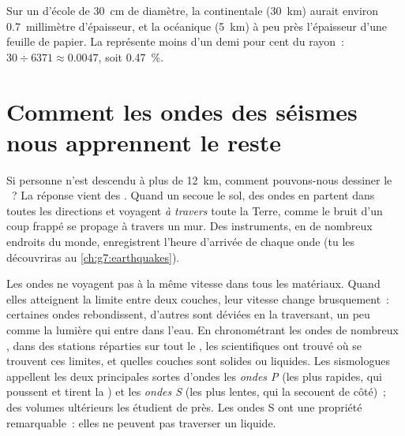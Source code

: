 \begin{remark}\label{rem:g6:inside-the-earth:thin-crust}
Sur un  d'école de 30~cm de diamètre, la  continentale (30~km)
aurait environ 0.7~millimètre d'épaisseur, et la  océanique (5~km)
à peu près l'épaisseur d'une feuille de papier. La  représente moins
d'un demi pour cent du rayon~: $30 \div 6371 \approx 0.0047$, soit
0.47~\%.
\end{remark}

\section{Comment les ondes des séismes nous apprennent le reste}\label{sec:g6:inside-the-earth:waves}

Si personne n'est descendu à plus de 12~km, comment pouvons-nous dessiner
le ~? La réponse vient des . Quand un  secoue le sol, des
ondes en partent dans toutes les directions et voyagent \emph{à travers}
toute la Terre, comme le bruit d'un coup frappé se propage à travers un
mur. Des instruments, en de nombreux endroits du monde, enregistrent
l'heure d'arrivée de chaque onde (tu les découvriras au
\cref{ch:g7:earthquakes}).

Les ondes ne voyagent pas à la même vitesse dans tous les matériaux. Quand
elles atteignent la limite entre deux couches, leur vitesse change
brusquement~: certaines ondes rebondissent, d'autres sont déviées en la
traversant, un peu comme la lumière qui entre dans l'eau. En chronométrant
les ondes de nombreux , dans des stations réparties sur tout le
, les scientifiques ont trouvé où se trouvent ces limites, et quelles
couches sont solides ou liquides. Les sismologues appellent les deux
principales sortes d'ondes les \emph{ondes P} (les plus rapides, qui
poussent et tirent la ) et les \emph{ondes S} (les plus lentes, qui
la secouent de côté)~; des volumes ultérieurs les étudient de près. Les
ondes S ont une propriété remarquable~: elles ne peuvent pas traverser un
liquide.

